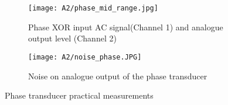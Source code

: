 \begin{figure}[H]
\centering
\begin{subfigure}{.5\textwidth}
     \centering
    \texttt{[image: A2/phase\_mid\_range.jpg]}
    \caption{Phase XOR input AC signal(Channel 1) and analogue output level (Channel 2)}
    \label{subfig:phase_oscillo}
\end{subfigure}%
\begin{subfigure}{.5\textwidth}
     \centering
    \texttt{[image: A2/noise\_phase.JPG]}
    \caption{Noise on analogue output of the phase transducer}
    \label{fig:phase_noise}
\end{subfigure}
\label{phase_practical}
\caption{Phase transducer practical measurements}
\end{figure}


